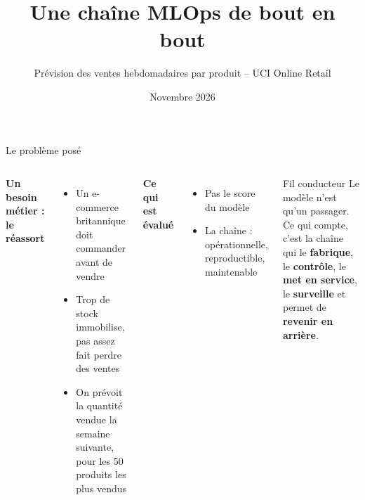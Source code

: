 \documentclass[aspectratio=169,11pt]{beamer}
\title{Une chaîne MLOps de bout en bout}
\subtitle{Prévision des ventes hebdomadaires par produit -- UCI Online Retail}
\author{\auteur}
\institute{5MLDE -- \etablissement}
\date{Novembre 2026}
\begin{document}
\maketitle

\begin{frame}{Le problème posé}
\small
\begin{columns}[T]
\textbf{Un besoin métier : le réassort}
\begin{itemize}
  \item Un e-commerce britannique doit commander avant de vendre
  \item Trop de stock immobilise, pas assez fait perdre des ventes
  \item On prévoit la \alert{quantité vendue la semaine suivante}, pour les
        \alert{50 produits} les plus vendus
\end{itemize}
\vspace{6pt}
\textbf{Ce qui est évalué}
\begin{itemize}
  \item Pas le score du modèle
  \item La \alert{chaîne} : opérationnelle, reproductible, maintenable
\end{itemize}
\begin{block}{Fil conducteur}
Le modèle n'est qu'un passager.\\[4pt]
Ce qui compte, c'est la chaîne qui le \textbf{fabrique}, le \textbf{contrôle}, le
\textbf{met en service}, le \textbf{surveille} et permet de \textbf{revenir en arrière}.
\end{block}
\end{columns}
\end{frame}
\end{document}
